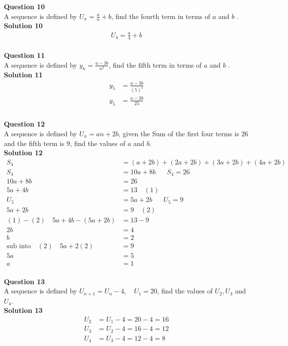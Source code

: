 \documentclass{article}
\begin{document}
\noindent\textbf{Question 10}\\[5pt]
A sequence is defined by $U_n=\displaystyle\frac{a}{n}+b$, find the fourth term in terms of $a$ and $b$ .\\[5pt]
\noindent\textbf{Solution 10}\\[5pt]
\begin{align*}
U_4=\displaystyle\frac{a}{4}+b
\end{align*}\\[10pt]

\noindent\textbf{Question 11}\\[5pt]
A sequence is defined by $y_n=\displaystyle\frac{a-3b}{n^2}$, find the fifth term in terms of $a$ and $b$ .\\[5pt]
\noindent\textbf{Solution 11}\\[5pt]
\begin{align*}
y_5&=\displaystyle\frac{a-3b}{(5)^2}\\[2pt]
y_5&=\displaystyle\frac{a-3b}{25}\\[2pt]
\end{align*}\\[10pt]

\noindent\textbf{Question 12}\\[5pt]
A sequence is defined by $U_n=an+2b$, given the Sum of the first four terms is $26$ and the fifth term is $9$, find the values of $a$ and $b$.\\[5pt]
\noindent\textbf{Solution 12}\\[5pt]
\begin{align*}
S_4&=(a+2b)+(2a+2b)+(3a+2b)+(4a+2b)\\[2pt]
S_4&=10a+8b\hspace{20pt} S_4=26\\[2pt]
10a+8b&=26\\[2pt]
5a+4b&=13\quad (1)\\[12pt]
U_5&=5a+2b\hspace{20pt}U_5=9\\[2pt]
5a+2b&=9\quad (2)\\[12pt]
(1)-(2)\quad 5a+4b-(5a+2b)&=13-9\\[2pt]
2b&=4\\[2pt]
b&=2\\[12pt]
\text{sub into}\quad (2) \quad 5a+2(2)&=9\\[2pt]
5a&=5\\[2pt]
a&=1
\end{align*}\\[10pt]

\noindent\textbf{Question 13}\\[5pt]
A sequence is defined by $U_{n+1}=U_n-4, \quad U_1=20$, find the values of $U_2,U_3$ and $U_4$.\\[5pt]
\noindent\textbf{Solution 13}\\[5pt]
\begin{align*}
U_2&=U_1-4=20-4=16\\[2pt]
U_3&=U_2-4=16-4=12\\[2pt]
U_4&=U_3-4=12-4=8
\end{align*}\\[10pt]
\end{document}
